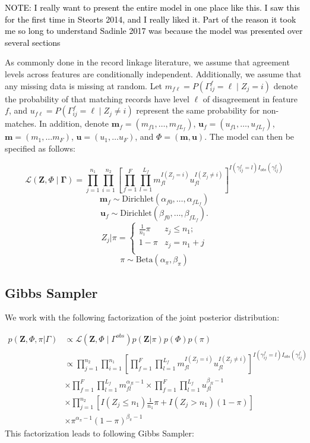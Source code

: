 \documentclass[12pt,letterpaper]{article}
\newcommand{\1}[1]{\mathbb{I}\!\left[#1\right]} %
\begin{document}
{\textcolor{black}{NOTE: I really want to present the entire model in one place like this. I saw this for the first time in Steorts 2014, and I really liked it. Part of the reason it took me so long to understand Sadinle 2017 was because the model was presented over several sections} 


As commonly done in the record linkage literature, we assume that agreement levels across features are conditionally independent. Additionally, we assume that any missing data is missing at random. Let  $m_{f\ell} = P(\Gamma_{ij}^f = \ell \mid Z_j = i)$ denote the probability of that matching records have level $\ell$ of disagreement in feature $f$, and $u_{f\ell} = P(\Gamma_{ij}^f = \ell \mid Z_j \neq i)$ represent the same probability for non-matches. In addition, denote $\bm{m}_f = (m_{f1}, \ldots, m_{fL_f})$, $\bm{u}_f = (u_{f1}, \ldots, u_{fL_f})$, $\bm{m}= (m_1, \ldots m_F)$, $\bm{u}= (u_1, \ldots u_F)$, and $\Phi = (\bm{m}, \bm{u})$.
The model can then be specified as follows:

$$\mathcal{L}(\bm{Z}, \Phi \mid \bm{\Gamma}) = \prod_{j=1}^{n_1}  \prod_{i=1}^{n_2}\left[ \prod_{f=1}^{F}\prod_{l=1}^{L_f} m_{fl}^{I(Z_j = i)}u_{fl}^{I(Z_j \neq i)}\right]^{I(\gamma_{ij}^f = l)I_{obs}(\gamma_{ij}^f)}$$
$$\bm{m}_f \sim \text{Dirichlet}(\alpha_{f0}, \ldots, \alpha_{f L_f})$$
$$\bm{u}_f \sim \text{Dirichlet}(\beta_{f0}, \ldots, \beta_{f L_f}).$$
$$Z_j | \pi =
\begin{cases} 
	\frac{1}{n_1}\pi  & z_j \leq n_1; \\
	1-\pi &  z_j  = n_1 + j \\
\end{cases}$$
$$\pi \sim \text{Beta}(\alpha_{\pi}, \beta_{\pi})$$


\hypertarget{posterior-sampling}{%
	\subsection{Gibbs Sampler}
	\label{gibbs_sampling}}
We work with the following factorization of the joint posterior distribution:

\begin{align*}
	p(\mathbf{Z}, \Phi, \pi|\Gamma) &\propto \mathcal{L}(\bm{Z}, \Phi \mid \Gamma^{obs}) p(\mathbf{Z} | \pi) p(\Phi) p(\pi) \\
	&\propto \prod_{j=1}^{n_2}  \prod_{i=1}^{n_1}\left[ \prod_{f=1}^{F}\prod_{l=1}^{L_f} m_{fl}^{I(Z_j = i)}u_{fl}^{I(Z_j \neq i)}\right]^{I(\gamma_{ij}^f = l)I_{obs}(\gamma_{ij}^f)} \\
	&\times  \prod_{f=1}^{F}\prod_{l=1}^{L_f} m_{fl}^{\alpha_{fl} - 1}  \times\prod_{f=1}^{F}\prod_{l=1}^{L_f} u_{fl}^{\beta_{fl} - 1} \\
	&\times \prod_{j=1}^{n_2} \left[I(Z_j \leq n_1)\frac{1}{n_1}\pi + I(Z_j > n_1)(1 - \pi)\right] \\
	&\times \pi^{\alpha_{\pi} -1} (1-\pi)^{\beta_{\pi} -1}
\end{align*}
This factorization leads to following Gibbs Sampler:

}
\end{document}
